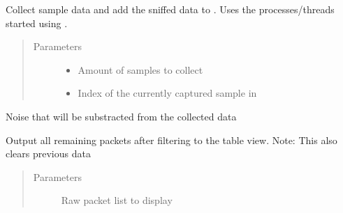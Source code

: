 \documentclass[letterpaper,10pt,english]{sphinxmanual}
\begin{document}
\begin{fulllineitems}
\begin{fulllineitems}
\label{\detokenize{src:src.FilterTab.FilterTab.getSampleData}}
Collect sample data and add the sniffed data to .
Uses the processes/threads started using {\hyperref[\detokenize{src:src.FilterTab.FilterTab.startSnifferAndAdder}]{}}.
\begin{quote}\begin{description}
\item[{Parameters}] \leavevmode\begin{itemize}
\item {} 
 \textendash{} Amount of samples to collect

\item {} 
 \textendash{} Index of the currently captured sample in 

\end{itemize}

\end{description}\end{quote}

\end{fulllineitems}


\begin{fulllineitems}
\label{\detokenize{src:src.FilterTab.FilterTab.noiseData}}
Noise that will be substracted from the collected data

\end{fulllineitems}


\begin{fulllineitems}
\label{\detokenize{src:src.FilterTab.FilterTab.outputRemainingPackets}}
Output all remaining packets after filtering to the table view.
Note: This also clears previous data
\begin{quote}\begin{description}
\item[{Parameters}] \leavevmode
{} \textendash{} Raw packet list to display


\end{description}
\end{quote}
\end{fulllineitems}
\end{fulllineitems}
\end{document}
